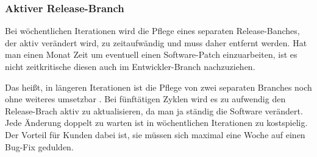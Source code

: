 \subsubsection{Aktiver Release-Branch}
Bei wöchentlichen Iterationen wird die Pflege eines separaten Release-Banches, der aktiv verändert wird, zu zeitaufwändig und muss daher entfernt werden. Hat man einen Monat Zeit um eventuell einen Software-Patch einzuarbeiten, ist es nicht zeitkritische diesen auch im Entwickler-Branch nachzuziehen. 

Das heißt, in längeren Iterationen ist die Pflege von zwei separaten Branches noch ohne weiteres umsetzbar \cite{dpunktkonfig2008}. Bei fünftätigen Zyklen wird es zu aufwendig den Release-Brach aktiv zu aktualisieren, da man ja ständig die Software verändert. Jede Änderung doppelt zu warten ist in wöchentlichen Iterationen zu kostspielig. Der Vorteil für Kunden dabei ist, sie müssen sich maximal eine Woche auf einen Bug-Fix gedulden.
